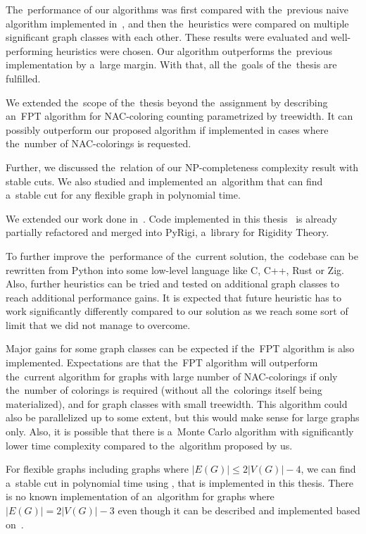 The~performance of our algorithms was
first compared with the~previous naive algorithm implemented in~\flexrilog{},
and then the~heuristics were compared on multiple significant graph classes
with each other.
%
These results were evaluated and well-performing heuristics were chosen.
Our algorithm outperforms the~previous implementation by a~large margin.
%
With that, all the~goals of the~thesis are fulfilled.

We extended the~scope of the~thesis beyond the~assignment by
describing an~FPT algorithm for NAC-coloring counting
parametrized by treewidth.
It can possibly outperform our proposed algorithm if implemented
in cases where the~number of NAC-colorings is requested.

Further, we discussed the~relation of our NP-completeness complexity result
with stable cuts.
We also studied and implemented an~algorithm that can find
a~stable cut for any flexible graph in polynomial time.

We extended our work done in~\cite{my_paper}.
Code implemented in this thesis~\cite{my_code} is already partially
refactored and merged into PyRigi, a~library for Rigidity Theory.


To further improve the~performance of the~current solution, the~codebase
can be rewritten from Python into some low-level language like C, C++, Rust or Zig.
Also, further heuristics can be tried
and tested on additional graph classes
to reach additional performance gains.
It is expected that future heuristic has to work significantly differently
compared to our solution as we reach some sort of limit
that we did not manage to overcome.

Major gains for some graph classes
can be expected if the~FPT algorithm is also implemented.
Expectations are that the~FPT algorithm will outperform the~current algorithm
for graphs with large number of NAC-colorings if only the~number of colorings
is required (without all the~colorings itself being materialized),
and for graph classes with small treewidth.
This algorithm could also be parallelized up to some extent,
but this would make sense for large graphs only.
%
Also, it is possible that there is a~Monte Carlo algorithm with significantly
lower time complexity compared to the~algorithm proposed by us.

For flexible graphs including graphs where \( |E(G)| \le 2|V(G)| - 4 \),
we can find a~stable cut in polynomial time using ,
that is implemented in this thesis.
There is no known implementation of an~algorithm
for graphs where \( |E(G)| = 2|V(G)| - 3 \)
even though it can be described and implemented
based on~\cite{stable_cuts_2v_3,stable_cuts_2v_3_revisit}.

